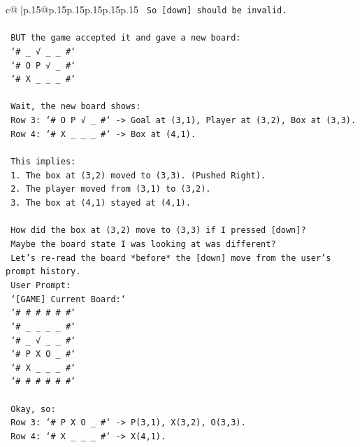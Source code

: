 \documentclass{article}
\begin{document}
{\begin{supertabular}{c@{$\;$}|p{.15\linewidth}@{}p{.15\linewidth}p{.15\linewidth}p{.15\linewidth}p{.15\linewidth}p{.15\linewidth}}
{{{\texttt{      So {[}down{]} should be invalid.} \\
\\ 
\texttt{      BUT the game accepted it and gave a new board:} \\
\texttt{      `\# \_ √ \_ \_ \#`} \\
\texttt{      `\# O P √ \_ \#`} \\
\texttt{      `\# X \_ \_ \_ \#`} \\
\\ 
\texttt{      Wait, the new board shows:} \\
\texttt{      Row 3: `\# O P √ \_ \#` {-}> Goal at (3,1), Player at (3,2), Box at (3,3).} \\
\texttt{      Row 4: `\# X \_ \_ \_ \#` {-}> Box at (4,1).} \\
\\ 
\texttt{      This implies:} \\
\texttt{      1. The box at (3,2) moved to (3,3). (Pushed Right).} \\
\texttt{      2. The player moved from (3,1) to (3,2).} \\
\texttt{      3. The box at (4,1) stayed at (4,1).} \\
\\ 
\texttt{      How did the box at (3,2) move to (3,3) if I pressed {[}down{]}?} \\
\texttt{      Maybe the board state I was looking at was different?} \\
\texttt{      Let's re{-}read the board *before* the {[}down{]} move from the user's prompt history.} \\
\texttt{      User Prompt:} \\
\texttt{      `{[}GAME{]} Current Board:`} \\
\texttt{      `\# \# \# \# \# \#`} \\
\texttt{      `\# \_ \_ \_ \_ \#`} \\
\texttt{      `\# \_ √ \_ \_ \#`} \\
\texttt{      `\# P X O \_ \#`} \\
\texttt{      `\# X \_ \_ \_ \#`} \\
\texttt{      `\# \# \# \# \# \#`} \\
\\ 
\texttt{      Okay, so:} \\
\texttt{      Row 3: `\# P X O \_ \#` {-}> P(3,1), X(3,2), O(3,3).} \\
\texttt{      Row 4: `\# X \_ \_ \_ \#` {-}> X(4,1).} \\
}}}
\end{supertabular}}
\end{document}
